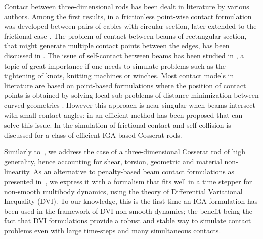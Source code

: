 \documentclass[review]{elsarticle}
\begin{document}
Contact between three-dimensional rods has been dealt in literature by various authors. Among the first results, in \cite{wriggers1997} a frictionless point-wise contact  formulation was developed between pairs of cables with circular section, later extended to the frictional case \cite{wriggers2000}. The problem of contact between beams of rectangular section, that might generate multiple contact points between the edges, has been discussed in \cite{Wriggers2002,litewka2002frictional}. The issue of self-contact between beams has been studied in \cite{chamekh2009,GayNeto2015}, a topic of great importance if one needs to simulate problems such as the tightening of knots, knitting machines or winches.
Most contact models in literature are based on point-based formulations where the position of contact points is obtained by solving local sub-problems of distance minimization between curved geometries \cite{konyukhov2010}. However this approach is near singular when beams intersect with small contact angles: in \cite{meier2016,meier2017} an efficient method has been proposed that can solve this issue.
In \cite{weeger2018frictional} the simulation of frictional contact and self collision is discussed for a class of efficient IGA-based Cosserat rods.

Similarly to~\cite{Weeger2017IGA}, we address the case of a three-dimensional Cosserat rod of high generality, hence accounting for shear, torsion, geometric and material non-linearity. As an alternative to penalty-based beam contact formulations as presented in~\cite{Weeger2017361}, we express it with a formalism that fits well in a time stepper for non-smooth multibody dynamics, using the theory of Differential Variational Inequality (DVI). 
To our knowledge, this is the first time an IGA formulation has been used in the framework of DVI non-smooth dynamics; the benefit being the fact that DVI formulations provide a robust and stable way to simulate contact problems even with large time-steps and many simultaneous contacts.
 
\end{document}
